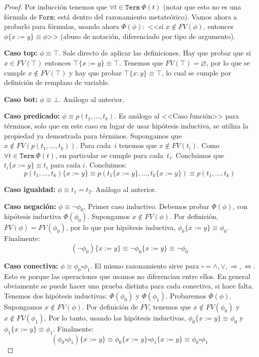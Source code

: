 \documentclass[a4paper, 12pt]{report}
\newcommand{\Ra}{\Rightarrow}
\newcommand{\Lra}{\Leftrightarrow}
\theoremstyle{definition}
\begin{document}
\begin{proof}
	Por inducción tenemos que $\forall t\in\mathtt{Term}~\Phi(t)$ (notar que esto no es una fórmula de $\mathtt{Form}$; está dentro del razonamiento metateórico). Vamos ahora a probarlo para fórmulas, usando ahora $\Phi(\phi):$ <<si $x\not\in FV(\phi)$, entonces $\phi\{x:=y\}\equiv \phi$>> (abuso de notación, diferenciado por tipo de argumento).
	
	\textbf{Caso top:} $\phi\equiv\top$. Sale directo de aplicar las definiciones. Hay que probar que si $x\in FV(\top)$ entonces $\top\{x:=y\}\equiv\top$. Tenemos que $FV(\top)=\varnothing$, por lo que se cumple $x\not\in FV(\top)$ y hay que probar $\top\{x:y\}\equiv\top$, lo cual se cumple por definición de remplazo de variable.
	
	\textbf{Caso bot:} $\phi\equiv\bot$. Análogo al anterior.
	
	\textbf{Caso predicado:} $\phi\equiv p(t_1,\dots,t_k)$. Es análogo al <<Caso función>> para términos, solo que en este caso en lugar de usar hipótesis inductiva, se utiliza la propiedad ya demostrada para términos. Supongamos que $x\not\in FV(p(t_1,\dots,t_k))$. Para cada~$i$ tenemos que $x\not\in FV(t_i)$. Como $\forall t\in\mathtt{Term}~\Phi(t)$, en particular se cumple para cada~$t_i$. Concluimos que $t_i\{x:=y\}\equiv t_i$ para cada $i$. Concluimos: $$p(t_1,\dots,t_k)\{x:=y\}\equiv p(t_1\{x:=y\},\dots,t_k\{x:=y\})\equiv p(t_1,\dots,t_k)$$
	
	\textbf{Caso igualdad:} $\phi\equiv t_1=t_2$. Análogo al anterior.
	
	\textbf{Caso negación:} $\phi\equiv\lnot\phi_0$. Primer caso inductivo. Debemos probar $\Phi(\phi)$, con hipótesis inductiva $\Phi(\phi_0)$. Supongamos $x\not\in FV(\phi)$. Por definición, $FV(\phi)=FV(\phi_0)$, por lo que por hipótesis inductiva, $\phi_0\{x:=y\}\equiv\phi_0$. Finalmente:
	$$ (\lnot\phi_0)\{x:=y\} \equiv \lnot \phi_0\{x:=y\}\equiv \lnot\phi_0
	$$
	
	\textbf{Caso conectiva:} $\phi\equiv \phi_0\square\phi_1$. El mismo razonamiento sirve para $\square =\wedge,\vee,\Ra,\Lra$. Esto es porque las operaciones que usamos no diferencian entre ellos. En general obviamente se puede hacer una prueba distinta para cada conectiva, si hace falta. Tenemos dos hipótesis inductivas: $\Phi(\phi_0)$ y $\Phi(\phi_1)$. Probaremos $\Phi(\phi)$. Supongamos $x\not\in FV(\phi)$. Por definición de $FV$, tenemos que $x\not\in FV(\phi_0)$ y $x\not\in FV(\phi_1)$. Por lo tanto, usando las hipótesis inductivas, $\phi_0\{x:=y\}\equiv \phi_0$ y $\phi_1\{x:=y\}\equiv \phi_1$. Finalmente:
	$$ (\phi_0\square\phi_1)\{x:=y\}\equiv \phi_0\{x:=y\}\square\phi_1\{x:=y\}\equiv \phi_0\square\phi_1
	$$
	

\end{proof}
\end{document}
